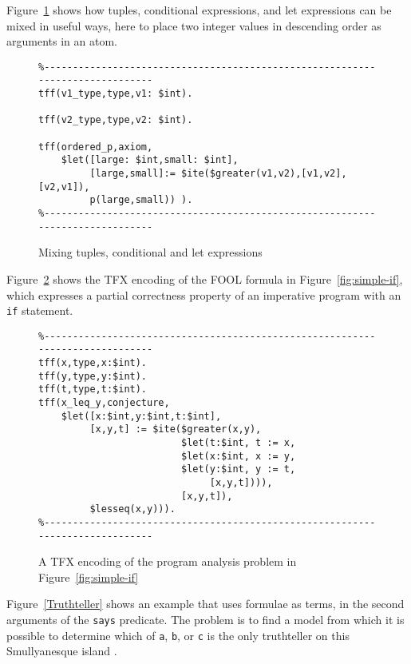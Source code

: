 \documentclass{easychair}
\begin{document}
Figure~\ref{TupleConditionalLet} shows how tuples, conditional expressions, 
and let expressions can be mixed in useful ways, here to place two integer
values in descending order as arguments in an atom.

\begin{figure}[htbp]
\begin{small}
\begin{verbatim}
%------------------------------------------------------------------------------
tff(v1_type,type,v1: $int).

tff(v2_type,type,v2: $int).

tff(ordered_p,axiom,
    $let([large: $int,small: $int],
         [large,small]:= $ite($greater(v1,v2),[v1,v2],[v2,v1]),
         p(large,small)) ).
%------------------------------------------------------------------------------
\end{verbatim}
\end{small}
\caption{Mixing tuples, conditional and let expressions}
\label{TupleConditionalLet}
\end{figure}

Figure~\ref{LetITE} shows the TFX encoding of the FOOL formula in
Figure~\ref{fig:simple-if}, which expresses a partial correctness property 
of an imperative program with an \texttt{if} statement.

\begin{figure}[htbp]
\begin{small}
\begin{verbatim}
%------------------------------------------------------------------------------
tff(x,type,x:$int).
tff(y,type,y:$int).
tff(t,type,t:$int).
tff(x_leq_y,conjecture,
    $let([x:$int,y:$int,t:$int],
         [x,y,t] := $ite($greater(x,y),
                         $let(t:$int, t := x,
                         $let(x:$int, x := y,
                         $let(y:$int, y := t,
                              [x,y,t]))),
                         [x,y,t]),
         $lesseq(x,y))).
%------------------------------------------------------------------------------
\end{verbatim}
\end{small}
\caption{A TFX encoding of the program analysis problem in
Figure~\ref{fig:simple-if}}
\label{LetITE}
\end{figure}

Figure~\ref{Truthteller} shows an example that uses formulae as terms, in
the second arguments of the {\tt says} predicate.
The problem is to find a model from which it is possible to determine which
of {\tt a}, {\tt b}, or {\tt c} is the only truthteller on this
Smullyanesque island \cite{Smu78}.
\end{document}
